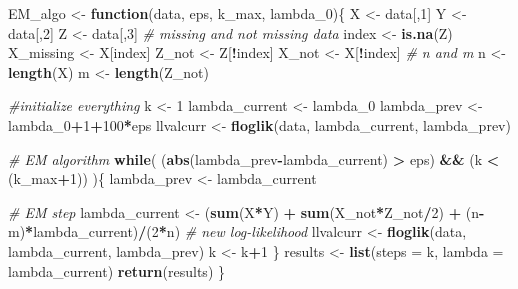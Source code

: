 \documentclass[
]{article}
\newenvironment{Shaded}{\begin{snugshade}}{\end{snugshade}}
\newcommand{\CommentTok}[1]{\textcolor[rgb]{0.56,0.35,0.01}{\textit{#1}}}
\newcommand{\ControlFlowTok}[1]{\textcolor[rgb]{0.13,0.29,0.53}{\textbf{#1}}}
\newcommand{\DataTypeTok}[1]{\textcolor[rgb]{0.13,0.29,0.53}{#1}}
\newcommand{\DecValTok}[1]{\textcolor[rgb]{0.00,0.00,0.81}{#1}}
\newcommand{\KeywordTok}[1]{\textcolor[rgb]{0.13,0.29,0.53}{\textbf{#1}}}
\newcommand{\NormalTok}[1]{#1}
\newcommand{\OperatorTok}[1]{\textcolor[rgb]{0.81,0.36,0.00}{\textbf{#1}}}
\newcommand{\StringTok}[1]{\textcolor[rgb]{0.31,0.60,0.02}{#1}}
\begin{document}
\begin{Shaded}
\begin{Highlighting}[]
{\NormalTok{EM_algo <-}\StringTok{ }\ControlFlowTok{function}\NormalTok{(data, eps, k_max, lambda_}\DecValTok{0}\NormalTok{)\{}
\NormalTok{  X <-}\StringTok{ }\NormalTok{data[,}\DecValTok{1}\NormalTok{]}
\NormalTok{  Y <-}\StringTok{ }\NormalTok{data[,}\DecValTok{2}\NormalTok{]}
\NormalTok{  Z <-}\StringTok{ }\NormalTok{data[,}\DecValTok{3}\NormalTok{]}
  \CommentTok{# missing and not missing data}
\NormalTok{  index <-}\StringTok{ }\KeywordTok{is.na}\NormalTok{(Z)}
\NormalTok{  X_missing <-}\StringTok{ }\NormalTok{X[index]}
\NormalTok{  Z_not <-}\StringTok{ }\NormalTok{Z[}\OperatorTok{!}\NormalTok{index]}
\NormalTok{  X_not <-}\StringTok{ }\NormalTok{X[}\OperatorTok{!}\NormalTok{index]}
  \CommentTok{# n and m}
\NormalTok{  n <-}\StringTok{ }\KeywordTok{length}\NormalTok{(X)}
\NormalTok{  m <-}\StringTok{ }\KeywordTok{length}\NormalTok{(Z_not)}
  
  \CommentTok{#initialize everything}
\NormalTok{  k <-}\StringTok{ }\DecValTok{1}
\NormalTok{  lambda_current <-}\StringTok{ }\NormalTok{lambda_}\DecValTok{0}
\NormalTok{  lambda_prev <-}\StringTok{ }\NormalTok{lambda_}\DecValTok{0}\OperatorTok{+}\DecValTok{1}\OperatorTok{+}\DecValTok{100}\OperatorTok{*}\NormalTok{eps}
\NormalTok{  llvalcurr <-}\StringTok{ }\KeywordTok{floglik}\NormalTok{(data, lambda_current, lambda_prev)}
  
  \CommentTok{# EM algorithm}
  \ControlFlowTok{while}\NormalTok{( (}\KeywordTok{abs}\NormalTok{(lambda_prev}\OperatorTok{-}\NormalTok{lambda_current) }\OperatorTok{>}\StringTok{ }\NormalTok{eps) }\OperatorTok{&&}\StringTok{  }\NormalTok{(k }\OperatorTok{<}\StringTok{ }\NormalTok{(k_max}\OperatorTok{+}\DecValTok{1}\NormalTok{)) )\{}
\NormalTok{    lambda_prev <-}\StringTok{ }\NormalTok{lambda_current}
    
    \CommentTok{# EM step}
\NormalTok{    lambda_current <-}\StringTok{ }\NormalTok{(}\KeywordTok{sum}\NormalTok{(X}\OperatorTok{*}\NormalTok{Y) }\OperatorTok{+}\StringTok{ }\KeywordTok{sum}\NormalTok{(X_not}\OperatorTok{*}\NormalTok{Z_not}\OperatorTok{/}\DecValTok{2}\NormalTok{) }\OperatorTok{+}\StringTok{ }\NormalTok{(n}\OperatorTok{-}\NormalTok{m)}\OperatorTok{*}\NormalTok{lambda_current)}\OperatorTok{/}\NormalTok{(}\DecValTok{2}\OperatorTok{*}\NormalTok{n)}
    \CommentTok{# new log-likelihood}
\NormalTok{    llvalcurr <-}\StringTok{ }\KeywordTok{floglik}\NormalTok{(data, lambda_current, lambda_prev)}
\NormalTok{    k <-}\StringTok{ }\NormalTok{k}\OperatorTok{+}\DecValTok{1}
\NormalTok{  \}}
\NormalTok{  results <-}\StringTok{ }\KeywordTok{list}\NormalTok{(}\DataTypeTok{steps =}\NormalTok{ k, }\DataTypeTok{lambda =}\NormalTok{ lambda_current)}
  \KeywordTok{return}\NormalTok{(results)}
\NormalTok{\}}

}
\end{Highlighting}
\end{Shaded}
\end{document}
